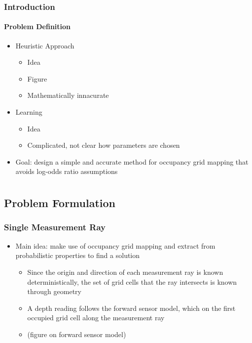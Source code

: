 \documentclass[11pt,professionalfonts,hyperref={pdftex,pdfpagemode=none,pdfstartview=FitH}]{beamer}
\renewcommand{\emph}[1]{\textit{\textbf{\color{blue}{#1}}}}
\begin{document}
\begin{frame}
\frametitle{Introduction}
\framesubtitle{Problem Definition}

\begin{itemize}
	\item Heuristic Approach
	\begin{itemize}
	\item Idea
	\item Figure
	\item Mathematically innacurate
	\end{itemize}
\vspace*{0.3cm}\pause
	\item Learning
	\begin{itemize}
	\item Idea
	\item Complicated, not clear how parameters are chosen
	\end{itemize}
\vspace*{0.3cm}\pause
	\item Goal: design a simple and accurate method for occupancy grid mapping that avoids log-odds ratio assumptions
\end{itemize}

\end{frame}



\section*{}
\subsection*{Problem Formulation}


\begin{frame}
\frametitle{Single Measurement Ray}

\begin{itemize}
    \item Main idea: make use of occupancy grid mapping \emph{assumptions} and extract \emph{paterns} from probabilistic properties to find a \emph{computationally-efficient} solution
	\begin{itemize}
		\item Since the origin and direction of each measurement ray is known deterministically, the set of grid cells that the ray intersects is known through geometry
		\item A depth reading follows the forward sensor model, which \emph{only depends} on the first occupied grid cell along the measurement ray
		\item (figure on forward sensor model)
	\end{itemize}
\end{itemize}
\end{frame}
\end{document}
